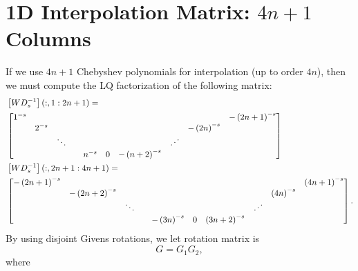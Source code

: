 \section{1D \CV{} Interpolation Matrix: $4n+1$ Columns}
\label{sec:CV_1D_4n}

If we use $4n+1$
Chebyshev polynomials for interpolation (up to order $4n$), then
we must compute the LQ factorization of the following matrix:
%
{\small
\begin{align}
    &\left[ WD_{s}^{-1} \right](:,1:2n+1) = \nonumber\\
        &\begin{bmatrix}
            1^{-s} & & & & & & & & & -\left( 2n+1 \right)^{-s} \\
            & 2^{-s} & & & & & & & -\left( 2n \right)^{-s} & \\
            & & \ddots & & & & & \iddots & & \\
            & & & & n^{-s} & 0 & -\left( n+2 \right)^{-s} & & & \\
        \end{bmatrix} \nonumber\\
    &\left[ WD_{s}^{-1} \right](:,2n+1:4n+1) = \nonumber\\
        &\begin{bmatrix}
            -\left( 2n+1 \right)^{-s} & & & & & & & & & \left( 4n+1 \right)^{-s} \\
            & -\left( 2n+2 \right)^{-s} & & & & & & & \left( 4n \right)^{-s} & \\
            & & \ddots & & & & & \iddots & & \\
            & & & & -\left( 3n \right)^{-s} & 0 & \left( 3n+2 \right)^{-s} & & & \\
        \end{bmatrix}.
\end{align}
}
%
By using disjoint Givens rotations, we let rotation matrix is
%
\begin{equation}
    G = G_{1}G_{2},
\end{equation}
%
where

